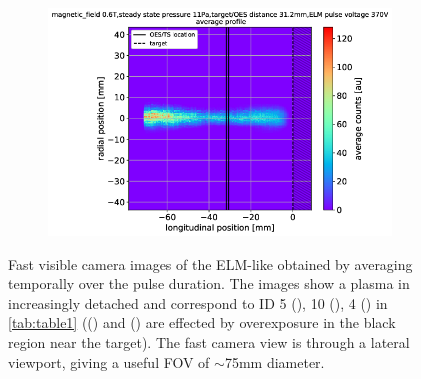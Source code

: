 \begin{figure}[!ht]
\begin{subfigure}{0.31\textwidth}
         {\color{white}\caption{\phantom{wewwwww}}\label{fig:ELMb}}
     \end{subfigure}
     \hfill
     \begin{subfigure}{0.31\textwidth}
         \centering
         \vspace*{-0mm}
         \includegraphics[width=\textwidth,trim={34 0 8 8},clip]{Chapters/chapter3/figs/fast_camera_merge_97_average3.png}
         \vspace*{-17mm}
         {\color{white}\caption{\phantom{wewwwww}}\label{fig:ELMc}}
     \end{subfigure}
        \vspace*{+6mm}
        \caption{Fast visible camera images of the ELM-like obtained by averaging temporally over the pulse duration. The images show a plasma in increasingly detached and correspond to ID 5 (), 10 (), 4 () in \autoref{tab:table1} (() and () are effected by overexposure in the black region near the target). The fast camera view is through a lateral viewport, giving a useful FOV of $\sim$75mm diameter.}
        \label{fig:ELM1}
\end{figure}

